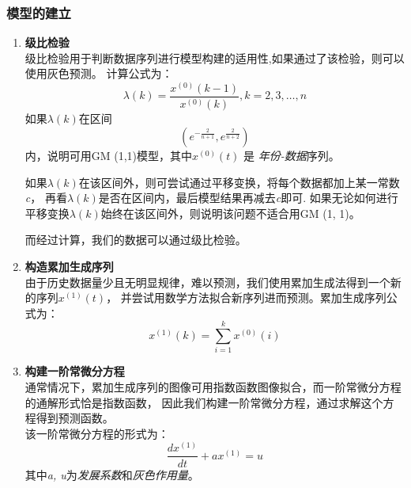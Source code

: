 \documentclass[a4paper, 12pt]{article}
\numberwithin{equation}{section}
\begin{document}
                \subsubsection{模型的建立}
                    \begin{enumerate}
                        \item \textbf{级比检验} \\
                            级比检验用于判断数据序列进行模型构建的适用性,如果通过了该检验，则可以使用灰色预测。
                            计算公式为：
                            \begin{equation}
                                \lambda (k) = \frac{x^{ (0)} (k - 1)}{x^{ (0)} (k)}, k = 2, 3, \ldots, n
                            \end{equation}
                            如果$ \lambda (k) $在区间
                            \[ (e^{-\frac{2}{n + 1}}, e^{\frac{2}{n + 2}}) \]
                            内，说明可用GM (1,1)模型，其中$ x^{ (0)} (t) $ 是 \textit{年份-数据}序列。

                            如果$ \lambda (k) $在该区间外，则可尝试通过平移变换，将每个数据都加上某一常数\textit{c}，
                            再看$ \lambda (k) $是否在区间内，最后模型结果再减去\textit{c}即可.
                            如果无论如何进行平移变换$ \lambda (k) $始终在该区间外，则说明该问题不适合用GM (1, 1)。

                            而经过计算，我们的数据可以通过级比检验。

                        \item \textbf{构造累加生成序列} \\
                            由于历史数据量少且无明显规律，难以预测，我们使用累加生成法得到一个新的序列$ x^{ (1)} (t) $，
                            并尝试用数学方法拟合新序列进而预测。累加生成序列公式为：
                            \begin{equation}
                                x^{ (1)} (k) = \sum_{i=1}^{k} x^{ (0)} (i)
                            \end{equation}

                        \item \textbf{构建一阶常微分方程} \\
                            通常情况下，累加生成序列的图像可用指数函数图像拟合，而一阶常微分方程的通解形式恰是指数函数，
                            因此我们构建一阶常微分方程，通过求解这个方程得到预测函数。 \\
                            该一阶常微分方程的形式为：
                            \begin{equation}
                                \frac{dx^{ (1)}}{dt} + ax^{ (1)} = u
                            \end{equation}
                            其中\textit{a, u}为\textit{发展系数}和\textit{灰色作用量}。
                    \end{enumerate}
\end{document}
